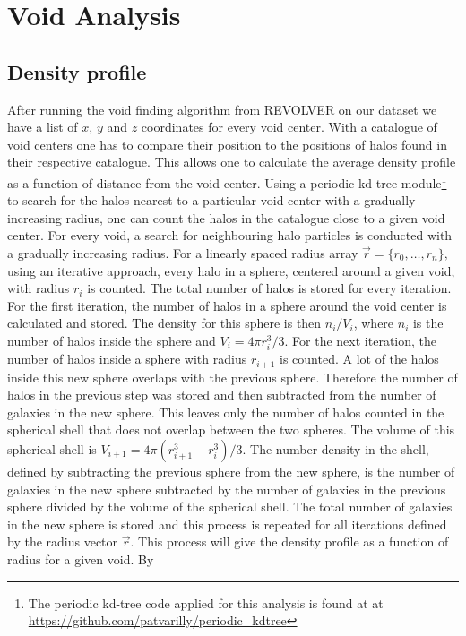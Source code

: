 \section{Void Analysis}
\subsection{Density profile}\label{sec:voiddensity}
After running the void finding algorithm from REVOLVER on our dataset we have a list of $x$, $y$
and $z$ coordinates for every void center. With a catalogue of void centers one
has to compare their position to the positions of halos found in their respective catalogue. This allows one to
calculate the average density profile as a function of distance from the void
center. Using a periodic kd-tree module\footnote{The periodic kd-tree code
applied for this analysis is found at at \url{https://github.com/patvarilly/periodic_kdtree}} to search for
the halos nearest to a particular void center with a gradually increasing radius, one can count the halos in
the catalogue close to a given void center. For every void, a search for
neighbouring halo particles is conducted with a gradually increasing radius. For
a linearly spaced radius array $\vec{r}=\{r_0,\dots,r_{n}\},$ using an iterative
approach, every halo in a sphere, centered around a given void, with radius $r_{i}$ is counted. The total number of halos is stored for
every iteration. For the first iteration, the number of halos in a sphere around the void
center is calculated and stored. The density for this sphere is then $n_i/V_i$,
where $n_i$ is the number of halos inside the sphere and $V_i=4\pi r_{i}^3/3$. For
the next iteration, the number of halos inside a sphere with radius $r_{i+1}$ is
counted. A lot of the halos inside this new sphere overlaps with the previous
sphere. Therefore the number of halos in the previous step was stored and then
subtracted from the number of galaxies in the new sphere. This leaves only the number
of halos counted in the spherical shell that does not overlap between the two
spheres. The volume of this spherical shell is $V_{i+1}=4\pi(r_{i+1}^3-r_i^3)/3$. The
number density in the shell, defined by subtracting the previous sphere from the
new sphere, is the number of galaxies in the new sphere subtracted by the number
of galaxies in the previous sphere divided by the volume of the spherical shell.
The total number of galaxies in the new sphere is stored and this process is
repeated for all iterations defined by the radius vector $\vec{r}$. This process
will give the density profile as a function of radius for a given void. By
